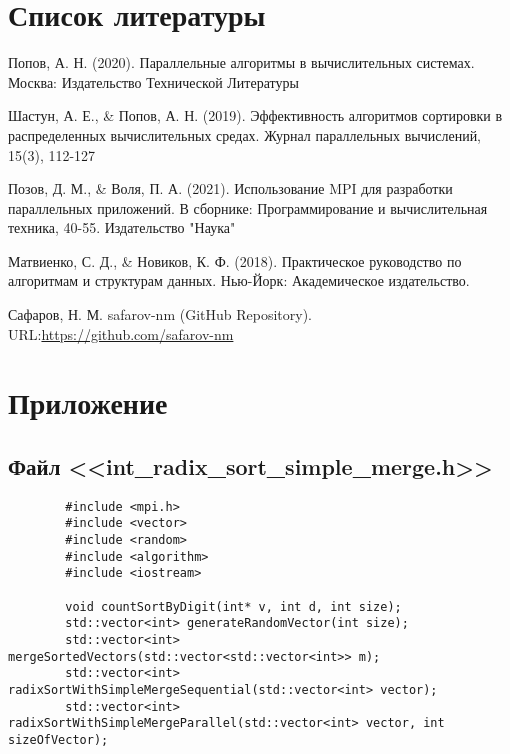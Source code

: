 \documentclass[a4paper, 14pt]{article}
\begin{document}
	\newpage
	\section*{\centering Список литературы}
	\begin{enumerate}[label={[\arabic*]}]
		\item Попов, А. Н. (2020). Параллельные алгоритмы в вычислительных системах. Москва: Издательство Технической Литературы
		\item Шастун, А. Е., \& Попов, А. Н. (2019). Эффективность алгоритмов сортировки в распределенных вычислительных средах. Журнал параллельных вычислений, 15(3), 112-127
		\item Позов, Д. М., \& Воля, П. А. (2021). Использование MPI для разработки параллельных приложений. В сборнике: Программирование и вычислительная техника, 40-55. Издательство "Наука"
		\item Матвиенко, С. Д., \& Новиков, К. Ф. (2018). Практическое руководство по алгоритмам и структурам данных. Нью-Йорк: Академическое издательство.
		\item Сафаров, Н. М. safarov-nm (GitHub Repository). URL:\href{https://github.com/safarov-nm}{https://github.com/safarov-nm}
	\end{enumerate}
	
	\newpage
	\section*{\centering Приложение}
	\subsection*{\centering Файл <<int\_radix\_sort\_simple\_merge.h>>}
	\begin{verbatim}
		#include <mpi.h>
		#include <vector>
		#include <random>
		#include <algorithm>
		#include <iostream>
		
		void countSortByDigit(int* v, int d, int size);
		std::vector<int> generateRandomVector(int size);
		std::vector<int> mergeSortedVectors(std::vector<std::vector<int>> m);
		std::vector<int> radixSortWithSimpleMergeSequential(std::vector<int> vector);
		std::vector<int> radixSortWithSimpleMergeParallel(std::vector<int> vector, int sizeOfVector);
	\end{verbatim}
	
\end{document}
